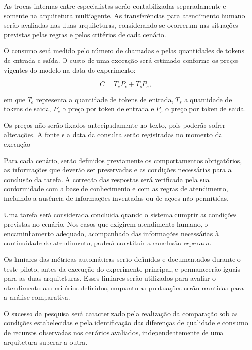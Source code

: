 As trocas internas entre especialistas serão contabilizadas
separadamente e somente na arquitetura multiagente. As transferências
para atendimento humano serão avaliadas nas duas arquiteturas,
considerando se ocorreram nas situações previstas pelas regras
e pelos critérios de cada cenário.

O consumo será medido pelo número de chamadas e pelas quantidades de tokens de entrada e saída. O custo de uma execução será estimado conforme os preços vigentes do modelo na data do experimento:

\begin{equation}
    C = T_e P_e + T_s P_s,
    \label{eq:custo-execucao}
\end{equation}

em que $T_e$ representa a quantidade de tokens de entrada, $T_s$ a quantidade de tokens de saída, $P_e$ o preço por token de entrada e $P_s$ o preço por token de saída.

Os preços não serão fixados antecipadamente no texto, pois poderão sofrer alterações. A fonte e a data da consulta serão registradas no momento da execução.

Para cada cenário, serão definidos previamente os comportamentos
obrigatórios, as informações que deverão ser preservadas e as
condições necessárias para a conclusão da tarefa. A correção das
respostas será verificada pela sua conformidade com a base de
conhecimento e com as regras de atendimento, incluindo a ausência
de informações inventadas ou de ações não permitidas.

Uma tarefa será considerada concluída quando o sistema cumprir
as condições previstas no cenário. Nos casos que exigirem
atendimento humano, o encaminhamento adequado, acompanhado das
informações necessárias à continuidade do atendimento, poderá
constituir a conclusão esperada.

Os limiares das métricas automáticas serão definidos e documentados
durante o teste-piloto, antes da execução do experimento principal,
e permanecerão iguais para as duas arquiteturas. Esses limiares
serão utilizados para avaliar o atendimento aos critérios definidos,
enquanto as pontuações serão mantidas para a análise comparativa.

O sucesso da pesquisa será caracterizado pela realização da
comparação sob as condições estabelecidas e pela identificação
das diferenças de qualidade e consumo de recursos observadas
nos cenários avaliados, independentemente de uma arquitetura
superar a outra.

